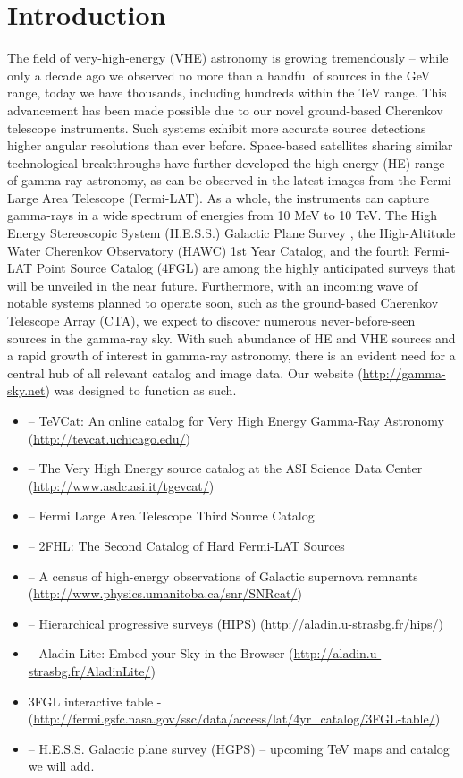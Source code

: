 \section{Introduction}

The field of very-high-energy (VHE) astronomy is growing tremendously – while only a decade ago we observed no more than a handful of sources in the GeV range, today we have thousands, including hundreds within the TeV range. This advancement has been made possible due to our novel ground-based Cherenkov telescope instruments. Such systems exhibit more accurate source detections higher angular resolutions than ever before. Space-based satellites sharing similar technological breakthroughs have further developed the high-energy (HE) range of gamma-ray astronomy, as can be observed in the latest images from the Fermi Large Area Telescope (Fermi-LAT). As a whole, the instruments can capture gamma-rays in a wide spectrum of energies from 10 MeV to 10 TeV. The High Energy Stereoscopic System (H.E.S.S.) Galactic Plane Survey \cite{hgps}, the High-Altitude Water Cherenkov Observatory (HAWC) 1st Year Catalog, and the fourth Fermi-LAT Point Source Catalog (4FGL) are among the highly anticipated surveys that will be unveiled in the near future. Furthermore, with an incoming wave of notable systems planned to operate soon, such as the ground-based Cherenkov Telescope Array (CTA), we expect to discover numerous never-before-seen sources in the gamma-ray sky. With such abundance of HE and VHE sources and a rapid growth of interest in gamma-ray astronomy, there is an evident need for a central hub of all relevant catalog and image data. Our website (\url{http://gamma-sky.net}) was designed to function as such.

\begin{itemize}
    \item \cite{tevcat} -- TeVCat: An online catalog for Very High Energy Gamma-Ray Astronomy (\url{http://tevcat.uchicago.edu/})
    \item \cite{tgevcat} -- The Very High Energy source catalog at the ASI Science Data Center (\url{http://www.asdc.asi.it/tgevcat/})
    \item \cite{3fgl} -- Fermi Large Area Telescope Third Source Catalog
    \item \cite{2fhl} -- 2FHL: The Second Catalog of Hard Fermi-LAT Sources
    \item \cite{snrcat} -- A census of high-energy observations of Galactic supernova remnants (\url{http://www.physics.umanitoba.ca/snr/SNRcat/})
    \item \cite{hips} -- Hierarchical progressive surveys (HIPS) (\url{http://aladin.u-strasbg.fr/hips/})
    \item \cite{aladin-lite} -- Aladin Lite: Embed your Sky in the Browser (\url{http://aladin.u-strasbg.fr/AladinLite/})
    \item 3FGL interactive table - (\url{http://fermi.gsfc.nasa.gov/ssc/data/access/lat/4yr_catalog/3FGL-table/})
    \item \cite{hgps} -- H.E.S.S. Galactic plane survey (HGPS) -- upcoming TeV maps and catalog we will add.
\end{itemize}
